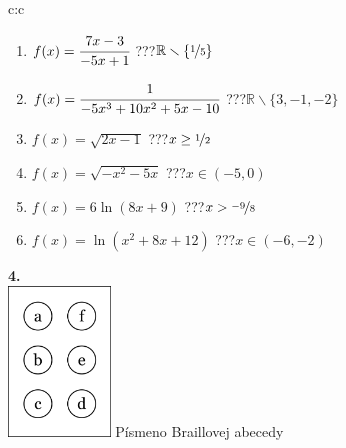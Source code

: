 \documentclass[10pt]{report}
\begin{document}
\begin{tabular}{c:c}
\begin{minipage}[c][104.5mm][t]{0.5\linewidth}
\begin{center}
\begin{minipage}{0.79\linewidth}
\begin{center}
\begin{varwidth}{\linewidth}
\begin{enumerate}
\item $f(x)=\cfrac{7x-3}{-5x+1}$\quad \dotfill\; ???\;\dotfill \quad $\mathbb{R}\smallsetminus\{\nicefrac{1}{5}\}$
\item $f(x)=\cfrac{1}{-5x^3+10x^2+5x-10}$\quad \dotfill\; ???\;\dotfill \quad $\mathbb{R}\smallsetminus\{3,-1,-2\}$
\item $f(x)=\sqrt{2x-1}$\quad \dotfill\; ???\;\dotfill \quad $x\geq\nicefrac{1}{2}$
\item $f(x)=\sqrt{-x^2-5x}$\quad \dotfill\; ???\;\dotfill \quad $x\in(-5 , 0)$
\item $f(x)=6\ln{(8x+9)}$\quad \dotfill\; ???\;\dotfill \quad $x>\nicefrac{-9}{8}$
\item $f(x)=\ln{(x^2+8x+12)}$\quad \dotfill\; ???\;\dotfill \quad $x\in(-6 , -2)$
\end{enumerate}
\end{varwidth}
\end{center}
\end{minipage}
\begin{minipage}{0.20\linewidth}
\begin{center}
{\Huge\bfseries 4.} \\[2mm]
\includegraphics[height=40mm]{../images/braille.png}
{\small Písmeno Braillovej abecedy}
\end{center}
\end{minipage}
\end{center}
\end{minipage}
%
\end{tabular}
\newpage
\thispagestyle{empty}
\end{document}
